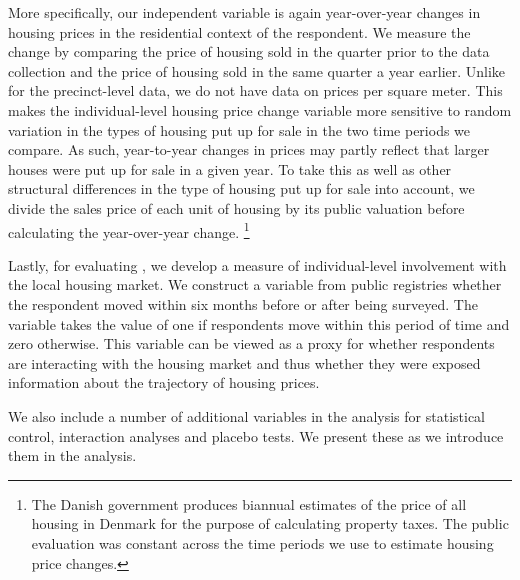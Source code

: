 \documentclass[12pt,a4paper]{article}
\begin{document}
	More specifically, our independent variable is again year-over-year changes in housing prices in the residential context of the respondent. We measure the change by comparing the price of housing sold in the quarter prior to the data collection and the price of housing sold in the same quarter a year earlier. Unlike for the precinct-level data, we do not have data on prices per square meter. This makes the individual-level housing price change variable more sensitive to random variation in the types of housing put up for sale in the two time periods we compare. As such, year-to-year changes in prices may partly reflect that larger houses were put up for sale in a given year. To take this as well as other structural differences in the type of housing put up for sale into account, we divide the sales price of each unit of housing by its public valuation before calculating the year-over-year change. \footnote{The Danish government produces biannual estimates of the price of all housing in Denmark for the purpose of calculating property taxes. The public evaluation was constant across the time periods we use to estimate housing price changes.}
	
	Lastly, for evaluating \htwo, we develop a measure of individual-level involvement with the local housing market. We construct a variable from public registries whether the respondent moved within six months before or after being surveyed. The variable takes the value of one if respondents move within this period of time and zero otherwise. This variable can be viewed as a proxy for whether respondents are interacting with the housing market and thus whether they were exposed information about the trajectory of housing prices.
	
	We also include a number of additional variables in the analysis for statistical control, interaction analyses and placebo tests. We present these as we introduce them in the analysis. 
	
\end{document}
